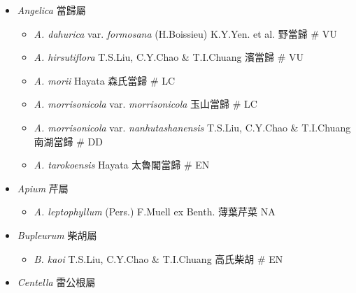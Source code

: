 
  \begin{itemize}
 \item[] \textit{Angelica} 當歸屬
                                
  \begin{itemize}
        \item[] \textit{A. dahurica} var. \textit{formosana} (H.Boissieu) K.Y.Yen. et al.  野當歸  \# VU
        \item[] \textit{A. hirsutiflora} T.S.Liu, C.Y.Chao \& T.I.Chuang  濱當歸  \# VU
        \item[] \textit{A. morii} Hayata  森氏當歸  \# LC
        \item[] \textit{A. morrisonicola} var. \textit{morrisonicola}   玉山當歸  \# LC
        \item[] \textit{A. morrisonicola} var. \textit{nanhutashanensis} T.S.Liu, C.Y.Chao \& T.I.Chuang  南湖當歸  \# DD
        \item[] \textit{A. tarokoensis} Hayata  太魯閣當歸  \# EN
  \end{itemize}
 \item[] \textit{Apium} 芹屬
                                
  \begin{itemize}
        \item[] \textit{A. leptophyllum} (Pers.) F.Muell ex Benth.  薄葉芹菜   NA
  \end{itemize}
 \item[] \textit{Bupleurum} 柴胡屬
                                
  \begin{itemize}
        \item[] \textit{B. kaoi} T.S.Liu, C.Y.Chao \& T.I.Chuang  高氏柴胡  \# EN
  \end{itemize}
 \item[] \textit{Centella} 雷公根屬
                                

\end{itemize}
